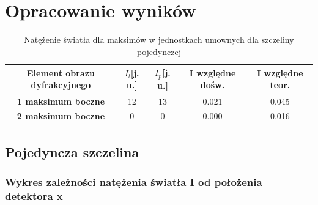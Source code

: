 \documentclass{article}
\begin{document}
\section{Opracowanie wyników}

\begin{table}[htbp]
\centering
{}
\caption{Położenia maksimów i minimów oraz obliczona szerokość d dla szczeliny pojedynczej}
\label{}
\end{table}

\begin{table}[htbp]
\centering
\begin{tabular}{|c|c|c|c|c|}
\hline
\textbf{Element obrazu dyfrakcyjnego} & \textbf{$I_{l}$[j. u.]} & \textbf{$I_{p}$[j. u.]} & \textbf{I względne dośw.                          } & \textbf{I względne teor.} \\ \hline
\textbf{1 maksimum boczne} & 12 & 13 & 0.021 & 0.045 \\ \hline
\textbf{2 maksimum boczne} & 0 & 0 & 0.000 & 0.016 \\ \hline
\end{tabular}
\caption{Natężenie światła dla maksimów w jednostkach umownych dla szczeliny pojedynczej}
\label{}
\end{table}

\subsection{Pojedyncza szczelina}
\subsubsection{Wykres zależności natężenia światła I od położenia detektora x}
\end{document}
